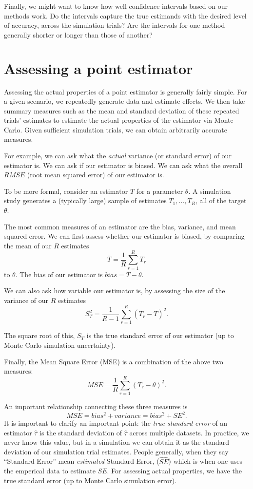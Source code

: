 \documentclass[
]{book}
\begin{document}
Finally, we might want to know how well confidence intervals based on our methods work.
Do the intervals capture the true estimands with the desired level of accuracy, across the simulation trials?
Are the intervals for one method generally shorter or longer than those of another?

\hypertarget{assessing-a-point-estimator}{%
\section{Assessing a point estimator}\label{assessing-a-point-estimator}}

Assessing the actual properties of a point estimator is generally fairly simple.
For a given scenario, we repeatedly generate data and estimate effects.
We then take summary measures such as the mean and standard deviation of these repeated trials' estimates to estimate the actual properties of the estimator via Monte Carlo.
Given sufficient simulation trials, we can obtain arbitrarily accurate measures.

For example, we can ask what the \emph{actual} variance (or standard error) of our estimator is.
We can ask if our estimator is biased.
We can ask what the overall \(RMSE\) (root mean squared error) of our estimator is.

To be more formal, consider an estimator \(T\) for a parameter \(\theta\).
A simulation study generates a (typically large) sample of estimates \(T_1,...,T_R\), all of the target \(\theta\).

The most common measures of an estimator are the bias, variance, and mean squared error.
We can first assess whether our estimator is biased, by comparing the mean of our \(R\) estimates
\[ \bar{T} = \frac{1}{R}\sum_{r=1}^R T_r \]
to \(\theta\).
The bias of our estimator is \(bias = \bar{T} - \theta\).

We can also ask how variable our estimator is, by assessing the size of the variance of our \(R\) estimates
\[\displaystyle{S_T^2 = \frac{1}{R - 1}\sum_{r=1}^R \left(T_r - \bar{T}\right)^2} . \]

The square root of this, \(S_T\) is the true standard error of our estimator (up to Monte Carlo simulation uncertainty).

Finally, the Mean Square Error (MSE) is a combination of the above two measures:
\[ MSE = \frac{1}{R} \sum_{r = 1}^R \left( T_r - \theta\right)^2 . \]

An important relationship connecting these three measures is
\[ MSE = bias^2 + variance = bias^2 + SE^2 .\]
It is important to clarify an important point: the \emph{true standard error} of an estimator \(\hat{\tau}\) is the standard deviation of \(\hat{\tau}\) across multiple datasets.
In practice, we never know this value, but in a simulation we can obtain it as the standard deviation of our simulation trial estimates.
People generally, when they say ``Standard Error'' mean \emph{estimated} Standard Error, (\(\widehat{SE}\)) which is when one uses the emperical data to estimate \(SE\).
For assessing actual properties, we have the true standard error (up to Monte Carlo simulation error).
\end{document}
